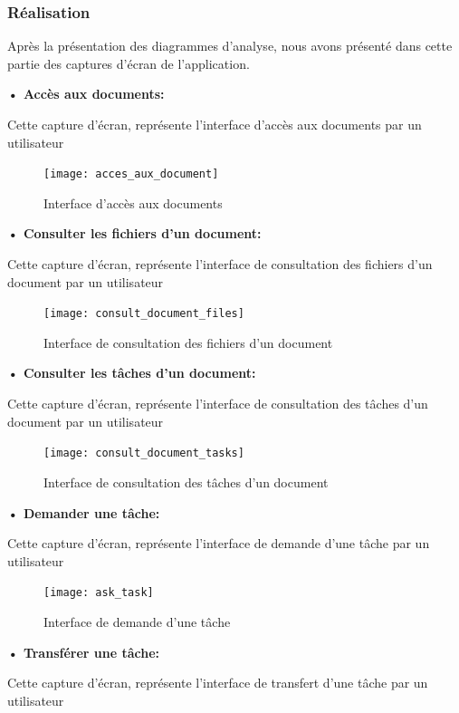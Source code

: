 \subsubsection{Réalisation}

Après la présentation des diagrammes d'analyse, nous avons présenté dans cette partie des captures d'écran de l'application.

\textbf{•	Accès aux documents:}

Cette capture d'écran, représente l'interface d'accès aux documents par un utilisateur

\begin{figure}[H]
  \centering
  \texttt{[image: acces\_aux\_document]}
  \caption{Interface d'accès aux documents}
  \label{fig:acces_aux_document}
\end{figure}

\textbf{•	Consulter les fichiers d'un document:}

Cette capture d'écran, représente l'interface de consultation des fichiers d'un document par un utilisateur

\begin{figure}[H]
  \centering
  \texttt{[image: consult\_document\_files]}
  \caption{Interface de consultation des fichiers d'un document}
  \label{fig:consult_document_files}
\end{figure}

\textbf{•	Consulter les tâches d'un document:}

Cette capture d'écran, représente l'interface de consultation des tâches d'un document par un utilisateur

\begin{figure}[H]
  \centering
  \texttt{[image: consult\_document\_tasks]}
  \caption{Interface de consultation des tâches d'un document}
  \label{fig:consult_document_tasks}
\end{figure}

\textbf{•	Demander une tâche:}

Cette capture d'écran, représente l'interface de demande d'une tâche par un utilisateur

\begin{figure}[H]
  \centering
  \texttt{[image: ask\_task]}
  \caption{Interface de demande d'une tâche}
  \label{fig:ask_task}
\end{figure}

\textbf{•	Transférer une tâche:}

Cette capture d'écran, représente l'interface de transfert d'une tâche par un utilisateur

